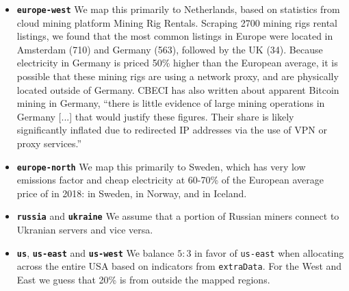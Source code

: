 \begin{appendices}
\begin{itemize}
    \item \textbf{\texttt{europe-west}} We map this primarily to Netherlands, based on statistics from cloud mining platform Mining Rig Rentals\cite{mining_rig_rentals_dagger-hashimoto_2021}. Scraping 2700 mining rigs rental listings, we found that the most common listings in Europe were located in Amsterdam (710) and Germany (563), followed by the UK (34). Because electricity in Germany is priced 50\% higher than the European average\cite{eurostat_fileelectricity_2021}, it is possible that these mining rigs are using a network proxy, and are physically located outside of Germany. CBECI has also written about apparent Bitcoin mining in Germany, ``there is little evidence of large mining operations in Germany [...] that would justify these figures. Their share is likely significantly inflated due to redirected IP addresses via the use of VPN or proxy services.''
    
    \item \textbf{\texttt{europe-north}} We map this primarily to Sweden, which has very low emissions factor and cheap electricity at 60-70\% of the European average price of \cite{steitz_cryptocurrency_2018} in 2018:  in Sweden,  in Norway, and  in Iceland.
    
    \item \textbf{\texttt{russia}} and \textbf{\texttt{ukraine}} We assume that a portion of Russian miners connect to Ukranian servers and vice versa.
    
    \item \textbf{\texttt{us}}, \textbf{\texttt{us-east}} and \textbf{\texttt{us-west}} We balance $5:3$ in favor of \texttt{us-east} when allocating across the entire USA based on indicators from \texttt{extraData}. For the West and East we guess that 20\% is from outside the mapped regions.
    
\end{itemize}

\end{appendices}